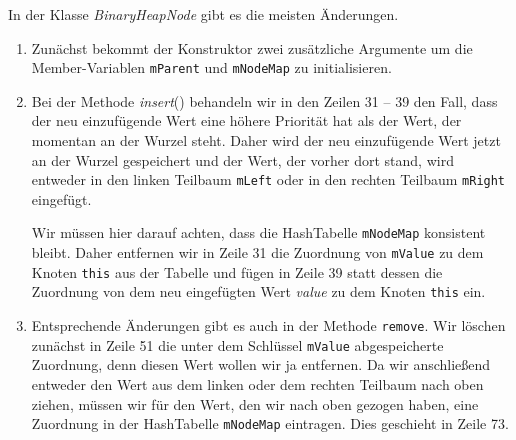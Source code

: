 In der Klasse \textsl{BinaryHeapNode} gibt es die meisten Änderungen.
\begin{enumerate}
\item Zun\"achst bekommt der Konstruktor zwei zus\"atzliche Argumente um die 
      Member-Variablen \texttt{mParent} und \texttt{mNodeMap} zu initialisieren. 
\item Bei der Methode \textsl{insert}() behandeln wir in den Zeilen 31 -- 39 
      den Fall, dass der neu einzuf\"ugende Wert eine h\"ohere Priorit\"at hat als der Wert, der
      momentan an der Wurzel steht.  Daher wird der neu einzuf\"ugende Wert
      jetzt an der Wurzel gespeichert und der Wert, der vorher dort stand,
      wird entweder in den linken Teilbaum \texttt{mLeft} oder in den
      rechten Teilbaum \texttt{mRight} eingef\"ugt.

      Wir m\"ussen hier darauf achten, dass die HashTabelle \texttt{mNodeMap} konsistent
      bleibt.  Daher entfernen wir in Zeile 31 die Zuordnung von \texttt{mValue} zu dem
      Knoten \texttt{this} aus der Tabelle und f\"ugen in Zeile 39 statt dessen 
      die Zuordnung von dem neu eingef\"ugten Wert \textsl{value} zu dem Knoten
      \texttt{this} ein.
\item Entsprechende Änderungen gibt es auch in der Methode \texttt{remove}.
      Wir l\"oschen zun\"achst in Zeile 51 die unter dem Schl\"ussel \texttt{mValue}
      abgespeicherte Zuordnung, denn diesen Wert wollen wir ja entfernen.
      Da wir anschlie{\ss}end entweder den Wert aus dem linken oder dem rechten Teilbaum 
      nach oben ziehen, m\"ussen wir f\"ur den Wert, den wir nach oben gezogen haben,
      eine Zuordnung in der HashTabelle \texttt{mNodeMap} eintragen. Dies geschieht
      in Zeile 73.


\end{enumerate}
